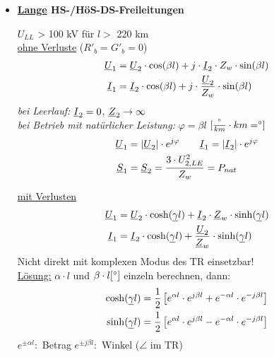 \begin{itemize}
\item[] \textbf{\ul{Lange} HS-/HöS-DS-Freileitungen}

    $U_{LL}$ > 100 kV für $l>$ 220 km\\

    \ul{ohne Verluste} ($R'_b = G'_b = 0$)
    \begin{align*}
        \underline{U}_1 &= \underline{U}_2 \cdot \cos(\beta l) + j \cdot \underline{I}_2 \cdot Z_w \cdot \sin (\beta l)\\
        \underline{I}_1 &= \underline{I}_2 \cdot \cos(\beta l) + j \cdot \frac{\underline{U}_2}{Z_w} \cdot \sin (\beta l)
    \end{align*}
    \textit{bei Leerlauf:} $\underline{I}_2 = 0$, $\underline{Z}_2 \rightarrow \infty$\\
    \textit{bei Betrieb mit natürlicher Leistung:} $\varphi = \beta l$  $[\frac{\degree}{km} \cdot km = \degree]$
    \begin{align*}
        \underline{U}_1 &= |\underline{U}_2| \cdot e^{j\varphi} \qquad
        \underline{I}_1 = |\underline{I}_2| \cdot e^{j\varphi}\\
        \underline{S}_1 &= \underline{S}_2 = \frac{3 \cdot U_{2,LE}^2}{Z_w} = P_{nat}
    \end{align*}

    \ul{mit Verlusten}
    \begin{align*}
        \underline{U}_1 &= \underline{U}_2 \cdot \cosh(\underline{\gamma} l) + \underline{I}_2 \cdot \underline{Z}_w \cdot \sinh(\underline{\gamma} l)\\
        \underline{I}_1 &= \underline{I}_2 \cdot \cosh(\underline{\gamma} l) + \frac{\underline{U}_2}{\underline{Z}_w}\cdot \sinh(\underline{\gamma} l)
    \end{align*}
    Nicht direkt mit komplexen Modus des TR einsetzbar!\\
    \ul{Lösung:} $\alpha \cdot l $ und $ \beta \cdot l [\degree]$ einzeln berechnen, dann:
    \begin{align*}
        \cosh(\underline{\gamma}l) &= \frac{1}{2} \left[e^{\alpha l} \cdot e^{j\beta l} + e^{-\alpha l} \cdot e^{-j\beta l} \right]\\
        \sinh (\underline{\gamma}l)&= \frac{1}{2} \left[e^{\alpha l} \cdot e^{j\beta l} - e^{-\alpha l} \cdot e^{-j\beta l} \right]
    \end{align*}
    $e^{\pm \alpha l }:$ Betrag \qquad $e^{\pm j\beta l}:$ Winkel ($\angle$ im TR)\\


\end{itemize}
